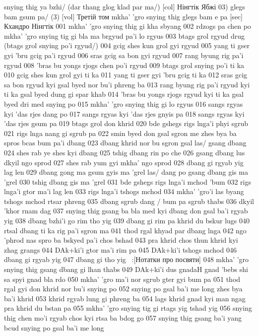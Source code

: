\documentclass{article}
\begin{document}
snying thig ya bzhi/ (dar thang glog klad par ma/) [col] Нінгтік Ябжі
03) glegs bam gsum pa/ (3) [vol] Третій том
mkha' 'gro snying thig glegs bam e pa [sec] Кхандро Нінгтік
001 mkha' 'gro snying thig gi kha sbyang
002 rdzogs pa chen po mkha' 'gro snying tig gi bla ma brgyud pa'i lo rgyus
003 btags grol rgyud drug (btags grol snying po'i rgyud/)
004 gcig shes kun grol gyi rgyud
005 yang ti gser gyi 'bru gcig pa'i rgyud
006 sras gcig sa bon gyi rgyud
007 rang byung rig pa'i rgyud
008 'bras bu yongs rjogs chen po'i rgyud
009 btags grol snying po'i ti ka
010 gcig shes kun grol gyi ti ka
011 yang ti gser gyi 'bru gcig ti ka
012 sras gcig sa bon rgyud kyi gsal byed nor bu'i phreng ba
013 rang byung rig pa'i rgyud kyi ti ka gsal byed dung gi spar khab
014 'bras bu yongs rjogs rgyud kyi ti ka gsal byed dri med snying po
015 mkha' 'gro snying thig gi lo rgyus
016 sangs rgyas kyi 'das rjes dang po
017 sangs rgyas kyi 'das rjes gnyis pa
018 sangs rgyas kyi 'das rjes gsum pa
019 btags grol don khrid
020 bde gshegs rigs lnga'i phyi sgrub
021 rigs lnga nang gi sgrub pa
022 smin byed don gsal sgron me zhes bya ba spros bcas bum pa'i dbang
023 dbang khrid nor bu sgron gsal las/ gsang dbang
024 shes rab ye shes kyi dbang
025 tshig dbang rin po che
026 gsang dbang lus dkyil ngo sprod
027 shes rab yum gyi mkha' ngo sprod
028 dbang gi rgyab yig lag len
029 dbang gong ma gsum gyis ma 'grel las/ dang po gsang dbang gis ma 'grel
030 tshig dbang gis ma 'grel
031 bde gshegs rigs lnga'i mchod 'bum
032 rigs lnga'i gtor ma'i lag len
033 rigs lnga'i tshogs mchod
034 mkha' 'gro'i las byang tshogs mchod rtsar phreng
035 dbang sgrub dang / bum pa sgrub thabs
036 dkyil 'khor rnam dag
037 snying thig gsang ba bla med kyi dbang don gsal ba'i rgyab yig
038 dbang bzhi'i go rim tho yig
039 dbang gi rim pa khrid du bskur lugs
040 rtsal dbang ti ka rig pa'i sgron ma
041 thod rgal khyad par dbang lnga
042 ngo 'phrod nas spro ba bskyed pa'i chos bshad
043 pra khrid chos thun khrid kyi zhag grangs
044 DAk+ki'i gtor ma'i rim pa
045 DAk+ki'i tshogs mchod
046 dbang gi rgyab yig
047 dbang gi tho yig ~:[Нотатки про посвяти]
048 mkha' 'gro snying thig gsang dbang gi lhan thabs
049 DAk+ki'i dus gnadaH gnad 'bebs shi sa spyi gnad bla rdo
050 mkha' 'gro ma'i nor sgrub gter gyi bum pa
051 thod rgal gyi don khrid nor bu'i snying po
052 snying po gsal ba'i me long zhes bya ba'i khrid
053 khrid rgyab lung gi phreng ba
054 lags khrid gnad kyi man ngag pra khrid du bstan pa
055 mkha' 'gro snying tig gi rtags yig tshad yig
056 snying thig chen mo'i rgyab chos kyi rtsa ba bdog go
057 snying thig gsang ba'i yang bcud snying po gsal ba'i me long
\end{document}
